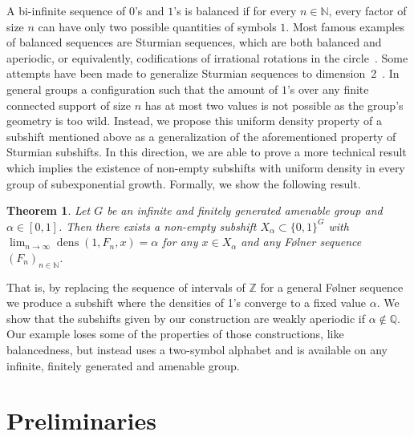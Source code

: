 \documentclass[letterpaper]{article}
\theoremstyle{plain}
\newtheorem{theorem}{Theorem}[section]
\def\NN{\mathbb{N}}
\def\ZZ{\mathbb{Z}}
\def\dens{\operatorname{dens}}
\newcommand{\cor}[2][]{#2}
\begin{document}
	
	A bi-infinite sequence of $0$'s and $1$'s is balanced if for every $n\in\NN$, every factor of size $n$ can have only two possible quantities of symbols $1$. Most famous examples of balanced sequences are Sturmian sequences, which are both balanced and aperiodic, or equivalently, codifications of irrational rotations in the circle~\cite{Lothaire,fogg2002substitutions}. Some attempts have been made to generalize Sturmian sequences to dimension~2~\cite{BertheVuillon2000,Fernique2006}. In general groups a configuration such that the amount of $1$'s over any finite connected support of size $n$ has at most two values is not possible as the group's geometry is too wild. Instead, we propose this uniform density property of a subshift \cor{mentioned above}{} as a generalization of the aforementioned property of Sturmian subshifts. In this direction, we are able to prove a more technical result which implies the existence of non-empty subshifts with uniform density in every group of subexponential growth. Formally, 
we show the following result\cor[ which makes sense in amenable groups]{}.
	{
		\renewcommand{\thetheorem}{\ref{theorem.densities}}
		\begin{theorem}
			Let $G$ be an infinite and finitely generated \cor{amenable} group and $\alpha \in [0,1]$. \cor[There is a non-empty subshift $X_{\alpha} \subset \{0,1\}^G$ such that for any $x \in X_{\alpha}$ and F\o lner sequence $(F_n)_{n \in \NN}$ then $\lim_{n \to \infty} \dens(1,F_n,x) = \alpha$]{Then there exists a non-empty subshift $X_{\alpha} \subset \{0,1\}^G$ with $\lim_{n \to \infty} \dens(1,F_n,x) = \alpha$ for any $x \in X_{\alpha}$ and any F\o lner sequence $(F_n)_{n \in \NN}$}.
		\end{theorem}
		\addtocounter{theorem}{-1}
	}
	
	That is, by replacing the sequence of intervals of $\ZZ$ for a general F\o lner sequence we produce a subshift where the densities of 1's converge to a fixed value $\alpha$. We show that the subshifts given by our construction are weakly aperiodic if $\alpha \notin \mathbb{Q}$. Our example loses some of the properties of those constructions, like balancedness, but instead uses a two-symbol alphabet and is available on any infinite, finitely generated and amenable group. 

	\section{Preliminaries}
	\label{section.preliminaries}
	
\end{document}
